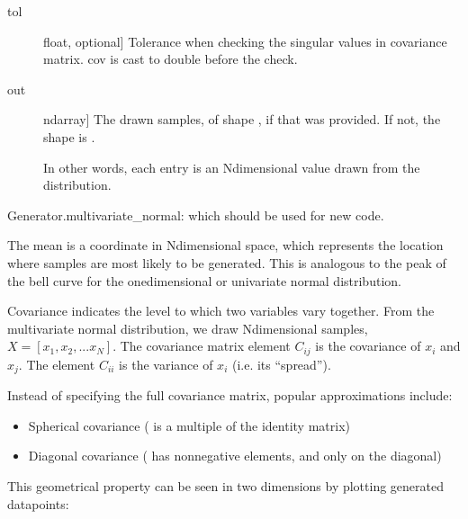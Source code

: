 \documentclass[letterpaper,10pt,english]{sphinxmanual}
\begin{document}
\begin{fulllineitems}
\begin{description}
\item[{tol}] \leavevmode{[}float, optional{]}
Tolerance when checking the singular values in covariance matrix.
cov is cast to double before the check.

\end{description}
\begin{description}
\item[{out}] \leavevmode{[}ndarray{]}
The drawn samples, of shape , if that was provided.  If not,
the shape is .

In other words, each entry  is an N\sphinxhyphen{}dimensional
value drawn from the distribution.

\end{description}

Generator.multivariate\_normal: which should be used for new code.

The mean is a coordinate in N\sphinxhyphen{}dimensional space, which represents the
location where samples are most likely to be generated.  This is
analogous to the peak of the bell curve for the one\sphinxhyphen{}dimensional or
univariate normal distribution.

Covariance indicates the level to which two variables vary together.
From the multivariate normal distribution, we draw N\sphinxhyphen{}dimensional
samples, \(X = [x_1, x_2, ... x_N]\).  The covariance matrix
element \(C_{ij}\) is the covariance of \(x_i\) and \(x_j\).
The element \(C_{ii}\) is the variance of \(x_i\) (i.e. its
“spread”).

Instead of specifying the full covariance matrix, popular
approximations include:
\begin{itemize}
\item {} 
Spherical covariance ( is a multiple of the identity matrix)

\item {} 
Diagonal covariance ( has non\sphinxhyphen{}negative elements, and only on
the diagonal)

\end{itemize}

This geometrical property can be seen in two dimensions by plotting
generated data\sphinxhyphen{}points:

\begin{sphinxVerbatim}[commandchars=\\\{\}]
  \PYG{p}{[} \PYG{p}{]}
  \PYG{p}{[}\PYG{p}{[} \PYG{p}{]} \PYG{p}{[} \PYG{p}{]}\PYG{p}{]}  
\end{sphinxVerbatim}


\end{fulllineitems}
\end{document}
